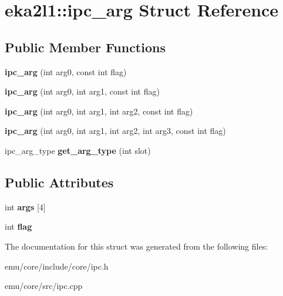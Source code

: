 \hypertarget{structeka2l1_1_1ipc__arg}{}\section{eka2l1\+:\+:ipc\+\_\+arg Struct Reference}
\label{structeka2l1_1_1ipc__arg}
\subsection*{Public Member Functions}
\begin{DoxyCompactItemize}
\item 
\mbox{\label{structeka2l1_1_1ipc__arg_ad531111dff7b112ae31a9a7fe8496c0b}} 
{\bfseries ipc\+\_\+arg} (int arg0, const int flag)
\item 
\mbox{\label{structeka2l1_1_1ipc__arg_aca5e48ed4e6cc48a1c5976f9f6f98f02}} 
{\bfseries ipc\+\_\+arg} (int arg0, int arg1, const int flag)
\item 
\mbox{\label{structeka2l1_1_1ipc__arg_ab6ce40b49f222ebf1eb4fe67b7a49e05}} 
{\bfseries ipc\+\_\+arg} (int arg0, int arg1, int arg2, const int flag)
\item 
\mbox{\label{structeka2l1_1_1ipc__arg_a490afeb1d50dcaff07134e35489482f9}} 
{\bfseries ipc\+\_\+arg} (int arg0, int arg1, int arg2, int arg3, const int flag)
\item 
\mbox{\label{structeka2l1_1_1ipc__arg_a23540489cc57d7316eca417e0f98f708}} 
ipc\+\_\+arg\+\_\+type {\bfseries get\+\_\+arg\+\_\+type} (int slot)
\end{DoxyCompactItemize}
\subsection*{Public Attributes}
\begin{DoxyCompactItemize}
\item 
\mbox{\label{structeka2l1_1_1ipc__arg_a948face772976a5dd2b78465ca1a4c17}} 
int {\bfseries args} \mbox{[}4\mbox{]}
\item 
\mbox{\label{structeka2l1_1_1ipc__arg_a7c2afd07363ac69ccba0a975b0e41b7b}} 
int {\bfseries flag}
\end{DoxyCompactItemize}


The documentation for this struct was generated from the following files\+:\begin{DoxyCompactItemize}
\item 
emu/core/include/core/ipc.\+h\item 
emu/core/src/ipc.\+cpp\end{DoxyCompactItemize}
